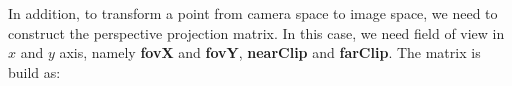 In addition, to transform a point from camera space to image space, we need to construct the perspective projection matrix. 
In this case, we need field of view in $x$ and $y$ axis, namely \textbf{fovX} and \textbf{fovY}, \textbf{nearClip} and \textbf{farClip}. The matrix is build as:
 










